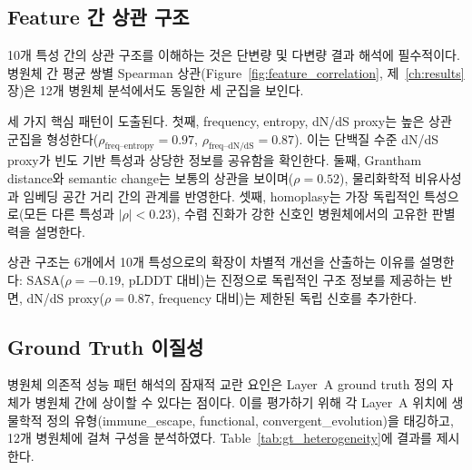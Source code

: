 \subsection{Feature 간 상관 구조}
\label{subsec:feature_correlation_adapt}

10개 특성 간의 상관 구조를 이해하는 것은 단변량 및 다변량 결과 해석에 필수적이다. 병원체 간 평균 쌍별 Spearman 상관(Figure~\ref{fig:feature_correlation}, 제~\ref{ch:results}장)은 12개 병원체 분석에서도 동일한 세 군집을 보인다.

세 가지 핵심 패턴이 도출된다.
첫째, frequency, entropy, dN/dS proxy는 높은 상관 군집을 형성한다($\rho_{\text{freq--entropy}} = 0.97$, $\rho_{\text{freq--dN/dS}} = 0.87$). 이는 단백질 수준 dN/dS proxy가 빈도 기반 특성과 상당한 정보를 공유함을 확인한다.
둘째, Grantham distance와 semantic change는 보통의 상관을 보이며($\rho = 0.52$), 물리화학적 비유사성과 임베딩 공간 거리 간의 관계를 반영한다.
셋째, homoplasy는 가장 독립적인 특성으로(모든 다른 특성과 $|\rho| < 0.23$), 수렴 진화가 강한 신호인 병원체에서의 고유한 판별력을 설명한다.

상관 구조는 6개에서 10개 특성으로의 확장이 차별적 개선을 산출하는 이유를 설명한다: SASA($\rho = -0.19$, pLDDT 대비)는 진정으로 독립적인 구조 정보를 제공하는 반면, dN/dS proxy($\rho = 0.87$, frequency 대비)는 제한된 독립 신호를 추가한다.

\subsection{Ground Truth 이질성}
\label{subsec:gt_heterogeneity_adapt}

병원체 의존적 성능 패턴 해석의 잠재적 교란 요인은 Layer~A ground truth 정의 자체가 병원체 간에 상이할 수 있다는 점이다.
이를 평가하기 위해 각 Layer~A 위치에 생물학적 정의 유형(immune\_escape, functional, convergent\_evolution)을 태깅하고, 12개 병원체에 걸쳐 구성을 분석하였다.
Table~\ref{tab:gt_heterogeneity}에 결과를 제시한다.

